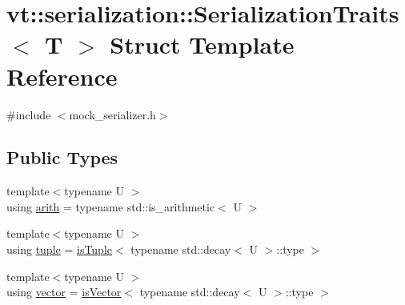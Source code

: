 \hypertarget{structvt_1_1serialization_1_1_serialization_traits}{}\section{vt\+:\+:serialization\+:\+:Serialization\+Traits$<$ T $>$ Struct Template Reference}
\label{structvt_1_1serialization_1_1_serialization_traits}


{\ttfamily \#include $<$mock\+\_\+serializer.\+h$>$}

\subsection*{Public Types}
\begin{DoxyCompactItemize}
\item 
{\footnotesize template$<$typename U $>$ }\\using \hyperlink{structvt_1_1serialization_1_1_serialization_traits_abb1c9363540c1a2d8b6843f8910df5b4}{arith} = typename std\+::is\+\_\+arithmetic$<$ U $>$
\item 
{\footnotesize template$<$typename U $>$ }\\using \hyperlink{structvt_1_1serialization_1_1_serialization_traits_ab7e5dd1f060f8077a26dc1c539e7c4fa}{tuple} = \hyperlink{structvt_1_1serialization_1_1is_tuple}{is\+Tuple}$<$ typename std\+::decay$<$ U $>$\+::type $>$
\item 
{\footnotesize template$<$typename U $>$ }\\using \hyperlink{structvt_1_1serialization_1_1_serialization_traits_a44712948817caf3f18d61fba6f6c1a18}{vector} = \hyperlink{structvt_1_1serialization_1_1is_vector}{is\+Vector}$<$ typename std\+::decay$<$ U $>$\+::type $>$
\end{DoxyCompactItemize}
